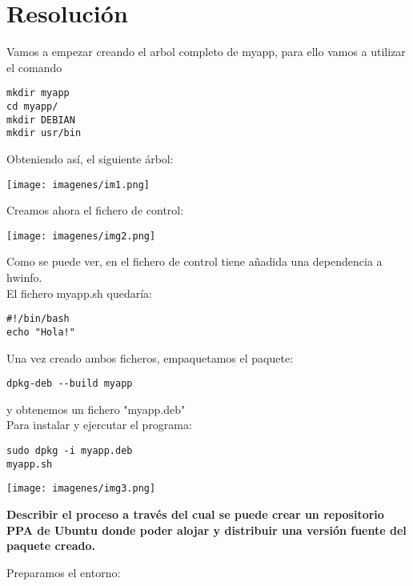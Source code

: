 \documentclass{article}
\begin{document}
 \section{Resolución}
 
Vamos a empezar creando el arbol completo de myapp, para ello vamos a utilizar el comando 

  \lstset{language=C, breaklines=true, basicstyle=\footnotesize}
\begin{lstlisting}[frame=single]
mkdir myapp
cd myapp/
mkdir DEBIAN
mkdir usr/bin
\end{lstlisting}

Obteniendo así, el siguiente árbol:
\begin{center}
\texttt{[image: imagenes/im1.png]} 
\end{center}
Creamos ahora el fichero de control:
\begin{center}
\texttt{[image: imagenes/img2.png]} 
\end{center}
Como se puede ver, en el fichero de control tiene añadida una dependencia a hwinfo.\\
El fichero myapp.sh quedaría:
  \lstset{language=C, breaklines=true, basicstyle=\footnotesize}
\begin{lstlisting}[frame=single]
#!/bin/bash
echo "Hola!"
\end{lstlisting}

Una vez creado ambos ficheros, empaquetamos el paquete:

  \lstset{language=C, breaklines=true, basicstyle=\footnotesize}
\begin{lstlisting}[frame=single]
dpkg-deb --build myapp
\end{lstlisting}

y obtenemos un fichero "myapp.deb"\\
Para instalar y ejercutar el programa:

  \lstset{language=C, breaklines=true, basicstyle=\footnotesize}
\begin{lstlisting}[frame=single]
sudo dpkg -i myapp.deb
myapp.sh
\end{lstlisting}
\begin{center}
\texttt{[image: imagenes/img3.png]} 
\end{center}


\textbf{Describir el proceso a través del cual se puede crear un repositorio PPA de Ubuntu donde poder alojar y distribuir una versión fuente del paquete creado.}

Preparamos el entorno:
\end{document}
